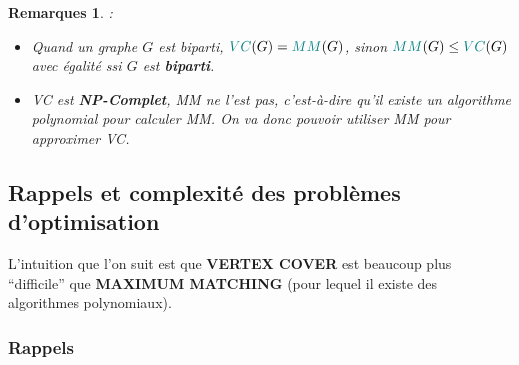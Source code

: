 \documentclass{article}
\newcommand{\titre}[1]{\textcolor{title}{#1}}
\newtheorem{rems}{Remarques}[section]
\begin{document}
\begin{sffamily}
\begin{rems}:
\begin{itemize}
\item Quand un graphe $G$ est biparti, $\titre{VC}(G) = \titre{MM}(G)$, sinon
$\titre{MM}(G) \leq \titre{VC}(G)$ avec égalité ssi $G$ est \textbf{biparti}.
\item \titre{VC} est \textbf{NP-Complet}, \titre{MM} ne l'est pas, c'est-à-dire
qu'il existe un algorithme polynomial pour calculer \titre{MM}. On va donc
pouvoir utiliser \titre{MM} pour approximer \titre{VC}.
\end{itemize}
\end{rems}

\subsection{Rappels et complexité des problèmes d'optimisation}
L'intuition que l'on suit est que \textbf{VERTEX COVER} est beaucoup plus
``difficile'' que \textbf{MAXIMUM MATCHING} (pour lequel il existe des
algorithmes polynomiaux).

\subsubsection*{Rappels}


\end{sffamily}
\end{document}
